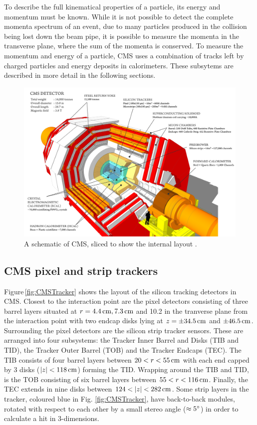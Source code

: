 To describe the full kinematical properties of a particle, its energy and momentum must be known. 
While it is not possible to detect the complete momenta spectrum of an event, due to many particles produced in the collision being lost down the beam pipe, it is possible to measure the momenta in the transverse plane, where the sum of the momenta is conserved. 
To measure the momentum and energy of a particle, CMS uses a combination of tracks left by charged particles and energy deposits in calorimeters.
These subsytems are described in more detail in the following sections.

\begin{landscape}
\centering
\begin{figure}[htpb]
	\centering
	\includegraphics[width=0.8\linewidth]{Figures/CMSPicture}
	\caption[A schematic of CMS, sliced to show the internal layout]{A schematic of CMS, sliced to show the internal layout \cite{CMSPicture}.}
	\label{fig:CMSPicture}
\end{figure}
\end{landscape}

\subsection{CMS pixel and strip trackers}
\label{ssec:Tracker}

Figure\,\ref{fig:CMSTracker} shows the layout of the silicon tracking detectors in CMS. 
Closest to the interaction point are the pixel detectors consisting of three barrel layers situated at $r=4.4\,\text{cm}, 7.3\,\text{cm}$ and 10.2\cm{} in the tranverse plane from the interaction point with two endcap disks lying at $z=\pm34.5\,\text{cm}$ and $\pm46.5\,\text{cm}$.  
Surrounding the pixel detectors are the silicon strip tracker sensors. 
These are arranged into four subsystems: the Tracker Inner Barrel and Disks (TIB and TID), the Tracker Outer Barrel (TOB) and the Tracker Endcaps (TEC).
The TIB consists of four barrel layers between $20<r<55\,\text{cm}$ with each end capped by 3 disks ($|z|<118\,\text{cm}$) forming the TID. 
Wrapping around the TIB and TID, is the TOB consisting of six barrel layers between $55<r<116\,\text{cm}$. 
Finally, the TEC extends in nine disks between $124<|z|<282\cm$.
Some strip layers in the tracker, coloured blue in Fig. \ref{fig:CMSTracker}, have back-to-back modules, rotated with respect to each other by a small stereo angle ($\approx5^\circ$) in order to calculate a hit in 3-dimensions.

